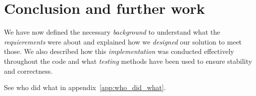 \section{Conclusion and further work} %
\label{sec:conclusion}
We have now defined the necessary \emph{background} to understand
what the \emph{requierements} were about and explained how we \emph{designed} 
our solution to meet those. We also described how this 
\emph{implementation} was conducted effectively throughout the code
and what \emph{testing} methods have been used to ensure stability
and correctness.


See who did what in appendix~\ref{app:who_did_what}.


